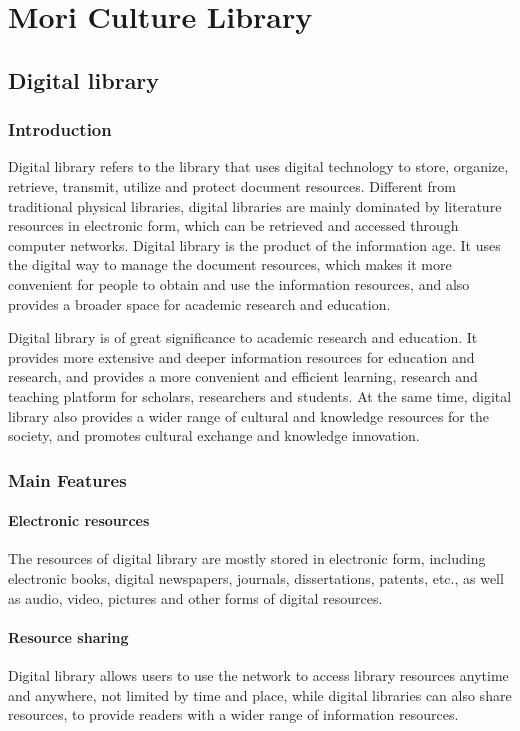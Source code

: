 \chapter{Mori Culture Library}

\section{Digital library}

\subsection{Introduction}
Digital library refers to the library that uses digital technology to store, organize, retrieve, transmit, utilize and protect document resources. Different from traditional physical libraries, digital libraries are mainly dominated by literature resources in electronic form, which can be retrieved and accessed through computer networks. Digital library is the product of the information age. It uses the digital way to manage the document resources, which makes it more convenient for people to obtain and use the information resources, and also provides a broader space for academic research and education.

Digital library is of great significance to academic research and education. It provides more extensive and deeper information resources for education and research, and provides a more convenient and efficient learning, research and teaching platform for scholars, researchers and students. At the same time, digital library also provides a wider range of cultural and knowledge resources for the society, and promotes cultural exchange and knowledge innovation.

\subsection{Main Features}
\subsubsection{Electronic resources}
The resources of digital library are mostly stored in electronic form, including electronic books, digital newspapers, journals, dissertations, patents, etc., as well as audio, video, pictures and other forms of digital resources.

\subsubsection{Resource sharing}
Digital library allows users to use the network to access library resources anytime and anywhere, not limited by time and place, while digital libraries can also share resources, to provide readers with a wider range of information resources.

